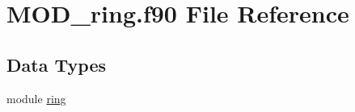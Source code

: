 \hypertarget{MOD__ring_8f90}{\section{M\-O\-D\-\_\-ring.\-f90 File Reference}
\label{MOD__ring_8f90}
}
\subsection*{Data Types}
\begin{DoxyCompactItemize}
\item 
module \hyperlink{classring}{ring}
\end{DoxyCompactItemize}
